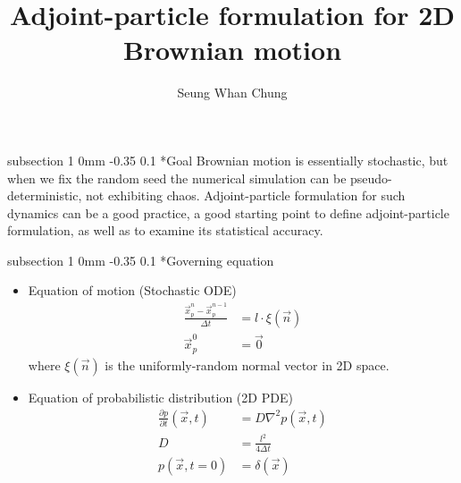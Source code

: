\documentclass[11pt]{article}
\title{Adjoint-particle formulation for 2D Brownian motion}
\author{Seung Whan Chung}
\makeatletter
\renewcommand{\subsection}{\@startsection
{subsection}%
{1}%
{0mm}%
{-0.35\baselineskip}%
{0.1\baselineskip}%
{\normalfont\large\bfseries\color{brown}}}%
\def\Dpartial#1#2{ \frac{\partial #1}{\partial #2} }
\newcommand{\vn}{\vec{n}}
\newcommand{\vx}{\vec{x}}
\newcommand{\xp}{\vec{x}_p}
\newcommand{\Dt}{\Delta t}
\makeatother
\begin{document}
\maketitle

\subsection*{Goal}
Brownian motion is essentially stochastic, but when we fix the random seed the numerical simulation can be pseudo-deterministic, not exhibiting chaos.
Adjoint-particle formulation for such dynamics can be a good practice, a good starting point to define adjoint-particle formulation,
as well as to examine its statistical accuracy.

\subsection*{Governing equation}
\begin{itemize}
\item Equation of motion (Stochastic ODE)
\begin{equation}
\begin{split}
\frac{\xp^n - \xp^{n-1}}{\Dt} &= l\cdot\xi(\vn)\\
\xp^0 &= \vec{0}
\end{split}
\end{equation}
where $\xi(\vn)$ is the uniformly-random normal vector in 2D space.
\item Equation of probabilistic distribution (2D PDE)
\begin{equation}
\begin{split}
\Dpartial{p}{t}(\vx,t) &= D\nabla^2p(\vx,t)\\
D &= \frac{l^2}{4\Dt}\\
p(\vx,t=0) &= \delta(\vx)
\end{split}
\end{equation}
\end{itemize}
\end{document}
